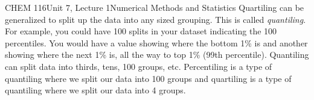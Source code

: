 \documentclass{article}
\begin{document}
\begin{tdoc}{CHEM 116}{Unit 7, Lecture 1}{Numerical Methods and Statistics}
Quartiling can be generalized to split up the data into any sized grouping. This is called \textit{quantiling}. For example, you could have 100 splits in your dataset indicating the 100 percentiles. You would have a value showing where the bottom 1\% is and another showing where the next 1\% is, all the way to top 1\% (99th percentile). Quantiling can split data into thirds, tens, 100 groups, etc. Percentiling is a type of quantiling where we split our data into 100 groups and quartiling is a type of quantiling where we split our data into 4 groups.

\end{tdoc}
\end{document}
